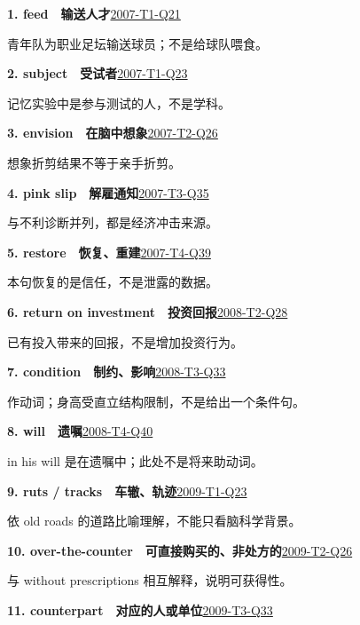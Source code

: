 \documentclass[11pt,a4paper]{article}
\begin{document}
\noindent\textbf{1. feed　输送人才}\hfill \hyperref[idx-2007-T1-Q21]{2007-T1-Q21}\par
青年队为职业足坛输送球员；不是给球队喂食。\par
{}\noindent\textbf{2. subject　受试者}\hfill \hyperref[idx-2007-T1-Q23]{2007-T1-Q23}\par
记忆实验中是参与测试的人，不是学科。\par
{}\noindent\textbf{3. envision　在脑中想象}\hfill \hyperref[idx-2007-T2-Q26]{2007-T2-Q26}\par
想象折剪结果不等于亲手折剪。\par
{}\noindent\textbf{4. pink slip　解雇通知}\hfill \hyperref[idx-2007-T3-Q35]{2007-T3-Q35}\par
与不利诊断并列，都是经济冲击来源。\par
{}\noindent\textbf{5. restore　恢复、重建}\hfill \hyperref[idx-2007-T4-Q39]{2007-T4-Q39}\par
本句恢复的是信任，不是泄露的数据。\par
{}\noindent\textbf{6. return on investment　投资回报}\hfill \hyperref[idx-2008-T2-Q28]{2008-T2-Q28}\par
已有投入带来的回报，不是增加投资行为。\par
{}\noindent\textbf{7. condition　制约、影响}\hfill \hyperref[idx-2008-T3-Q33]{2008-T3-Q33}\par
作动词；身高受直立结构限制，不是给出一个条件句。\par
{}\noindent\textbf{8. will　遗嘱}\hfill \hyperref[idx-2008-T4-Q40]{2008-T4-Q40}\par
in his will 是在遗嘱中；此处不是将来助动词。\par
{}\noindent\textbf{9. ruts / tracks　车辙、轨迹}\hfill \hyperref[idx-2009-T1-Q23]{2009-T1-Q23}\par
依 old roads 的道路比喻理解，不能只看脑科学背景。\par
{}\noindent\textbf{10. over-the-counter　可直接购买的、非处方的}\hfill \hyperref[idx-2009-T2-Q26]{2009-T2-Q26}\par
与 without prescriptions 相互解释，说明可获得性。\par
{}\noindent\textbf{11. counterpart　对应的人或单位}\hfill \hyperref[idx-2009-T3-Q33]{2009-T3-Q33}\par
\end{document}
